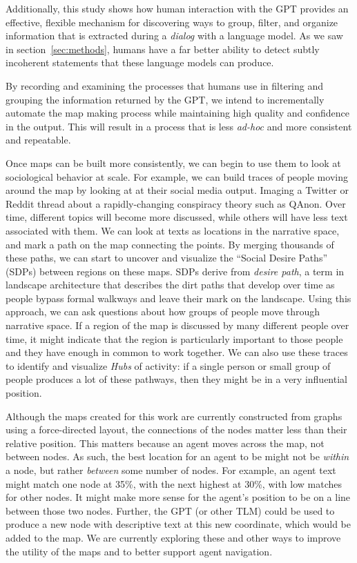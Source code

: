 \documentclass[11pt,dvipdfm]{article}
\begin{document}
Additionally, this study shows how human interaction with the GPT provides an effective, flexible mechanism for discovering ways to group, filter, and organize information that is extracted during a \textit{dialog} with a language model. As we saw in section~\ref{sec:methods}, humans have a far better ability to detect subtly incoherent statements that these language models can produce. 

By recording and examining the processes that humans use in filtering and grouping  the information returned by the GPT, we intend to incrementally automate the map making process while maintaining high quality and confidence in the output. This will result in a process that is less \textit{ad-hoc} and more consistent and repeatable.

Once maps can be built more consistently, we can begin to use them to look at sociological behavior at scale. For example, we can build traces of people moving around the map by looking at at their social media output. Imaging a Twitter or Reddit thread about a rapidly-changing conspiracy theory such as QAnon. Over time, different topics will become more discussed, while others will have less text associated with them. We can look at texts as locations in the narrative space, and mark a path on the map connecting the points. By merging thousands of these paths, we can start to uncover and visualize the \enquote{Social Desire Paths} (SDPs) between regions on these maps.  SDPs derive from \textit{desire path}, a term in landscape architecture that describes the dirt paths that develop over time as people bypass formal walkways and leave their mark on the landscape. Using this approach, we can ask questions about how groups of people move through narrative space. If a region of the map is discussed by many different people over time, it might indicate that the region is particularly important to those people and they have enough in common to work together. We can also use these traces to identify and visualize \textit{Hubs} of activity: if a single person or small group of people produces a lot of these pathways, then they might be in a very influential position. 

Although the maps created for this work are currently constructed from graphs using a force-directed layout, the connections of the nodes matter less than their relative position. This matters because an agent moves across the map, not between nodes. As such, the best location for an agent to be might not be \textit{within} a node, but rather \textit{between} some number of nodes. For example, an agent text might match one node at 35\%, with the next highest at 30\%, with low matches for other nodes. It might make more sense for the agent's position to be on a line between those two nodes. Further, the GPT (or other TLM) could be used to produce a new node with descriptive text at this new coordinate, which would be added to the map. We are currently exploring these and other ways to improve the utility of the maps and to better support agent navigation.
\end{document}
